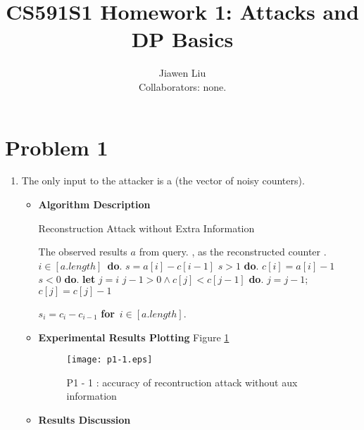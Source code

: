 \documentclass[11pt]{article}
\begin{document}
\title{
{\textbf{CS591S1 Homework 1: Attacks and DP Basics}}
}
\author{Jiawen Liu\\
Collaborators: none.}

\date{}
\maketitle

\section{Problem 1}

\begin{enumerate}
	\item The only input to the attacker is a (the vector of noisy counters).
\begin{itemize}
\item \textbf{Algorithm Description}
%
%
\begin{algorithm}
\caption{Reconstruction Attack without Extra Information}
\label{alg_p1-1}
\begin{algorithmic}
\REQUIRE The observed results $a$ from query.
, as the reconstructed counter . 
\ $i\in [a.length]$\ {\bf do}.  
\STATE {} 
	$s = a[i] - c[i - 1]$ 
\STATE {} $s > 1$  {\bf do}.
		$c[i] = a[i] - 1$
\STATE {} $s < 0$  {\bf do}.
\STATE \qquad \qquad 
		{\bf let} $j = i$
\STATE \qquad {} 
		$j - 1 > 0 \land c[j] < c[j - 1]$  {\bf do}.
		$j = j - 1$;
		$c[j] = c[j] - 1$
\STATE	{}

\RETURN $s_i = c_{i} - c_{i - 1}$ {\bf for}\ $i\in [a.length]$.
\end{algorithmic}
\end{algorithm}
%
\item \textbf{Experimental Results Plotting}
%
Figure \ref{fig-p1-1}
%
\begin{figure}[h]
    \centering
    \texttt{[image: p1-1.eps]}
    \caption{P1 - 1 : accuracy of recontruction attack without aux information}
    \label{fig-p1-1}
\end{figure}
%
\item \textbf{Results Discussion}
%


\end{itemize}
\end{enumerate}
\end{document}
